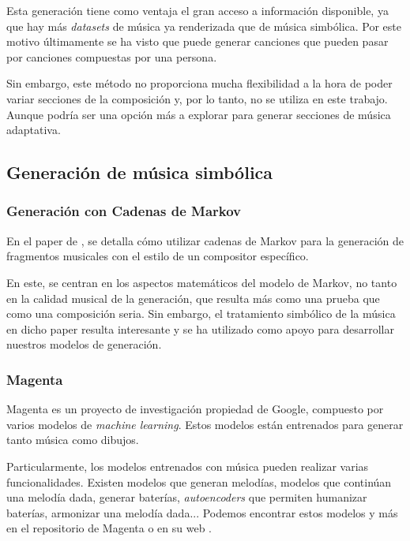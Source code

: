 Esta generación tiene como ventaja el gran acceso a información disponible, ya que hay más \textit{datasets} de música ya renderizada que de música simbólica. Por este motivo últimamente se ha visto que puede generar canciones que pueden pasar por canciones compuestas por una persona.

Sin embargo, este método no proporciona mucha flexibilidad a la hora de poder variar secciones de la composición y, por lo tanto, no se utiliza en este trabajo. Aunque podría ser una opción más a explorar para generar secciones de música adaptativa.

\subsection{Generación de música simbólica}

    \subsubsection{Generación con Cadenas de Markov}
    En el paper de \citet{MarkovChainPaper}, se detalla cómo utilizar cadenas de Markov para la generación de fragmentos musicales con el estilo de un compositor específico.

    En este, se centran en los aspectos matemáticos del modelo de Markov, no tanto en la calidad musical de la generación, que resulta más como una prueba que como una composición seria. Sin embargo, el tratamiento simbólico de la música en dicho paper resulta interesante y se ha utilizado como apoyo para desarrollar nuestros modelos de generación.

    \subsubsection{Magenta} 
    \label{subsec:definicionMagenta}

    Magenta es un proyecto de investigación propiedad de Google, compuesto por varios modelos de \textit{machine learning}. Estos modelos están entrenados para generar tanto música como dibujos.

    Particularmente, los modelos entrenados con música pueden realizar varias funcionalidades. Existen modelos que generan melodías, modelos que continúan una melodía dada, generar baterías, \textit{autoencoders} que permiten humanizar baterías, armonizar una melodía dada... Podemos encontrar estos modelos y más en el repositorio de Magenta \citep{MagentaRepo} o en su web \citep{MagentaWeb}.

